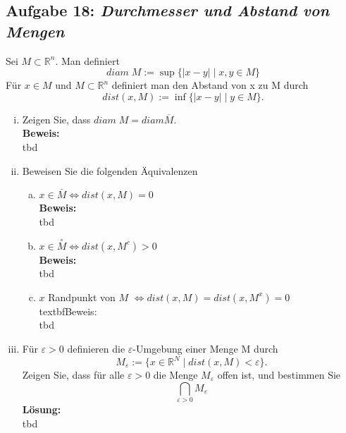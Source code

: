 \documentclass[11pt,a4paper,ngerman]{article}
\begin{document}
\subsection*{Aufgabe 18: \mdseries\itshape Durchmesser und Abstand von Mengen}
	Sei $M \subset \mathbb{R}^n$. Man definiert
	$$
		diam \; M := \sup \{ |x-y| \; | \; x,y \in M \}
	$$
	Für $x \in M$ und $M \subset \mathbb{R}^n$ definiert man den Abstand von x zu M durch
	$$
		dist (x,M) := \inf \{|x-y| \; | \; y \in M \}.
	$$
	\begin{enumerate}[(i)]
		\item Zeigen Sie, dass $diam \; M = diam \overline{M}$.\\
		\textbf{Beweis:}\\
			tbd

		\item Beweisen Sie die folgenden Äquivalenzen
			\begin{enumerate}[a)]
				\item $x \in \overline{M} \Longleftrightarrow dist(x,M) = 0$\\
				\textbf{Beweis:}\\
					tbd

				\item $x \in \overset{\circ}{M} \Longleftrightarrow dist(x,M^c) > 0$\\
				\textbf{Beweis:}\\
					tbd

				\item $x$ Randpunkt von $M$ $\Longleftrightarrow dist(x,M) = dist(x,M^x) = 0$\\
				textbf{Beweis:}\\
					tbd

			\end{enumerate}
		
		\item Für $\varepsilon > 0$ definieren die $\varepsilon$-Umgebung einer Menge M durch
			$$
				M_\varepsilon := \{ x \in \mathbb{R}^N \; | \; dist(x,M) < \varepsilon \}.
			$$
			Zeigen Sie, dass für alle $\varepsilon > 0$ die Menge $M_\varepsilon$ offen ist, und bestimmen Sie
			$$
				\underset{\varepsilon > 0}{\bigcap} M_\varepsilon
			$$
			\textbf{Lösung:}\\
				tbd
	\end{enumerate}
\end{document}
